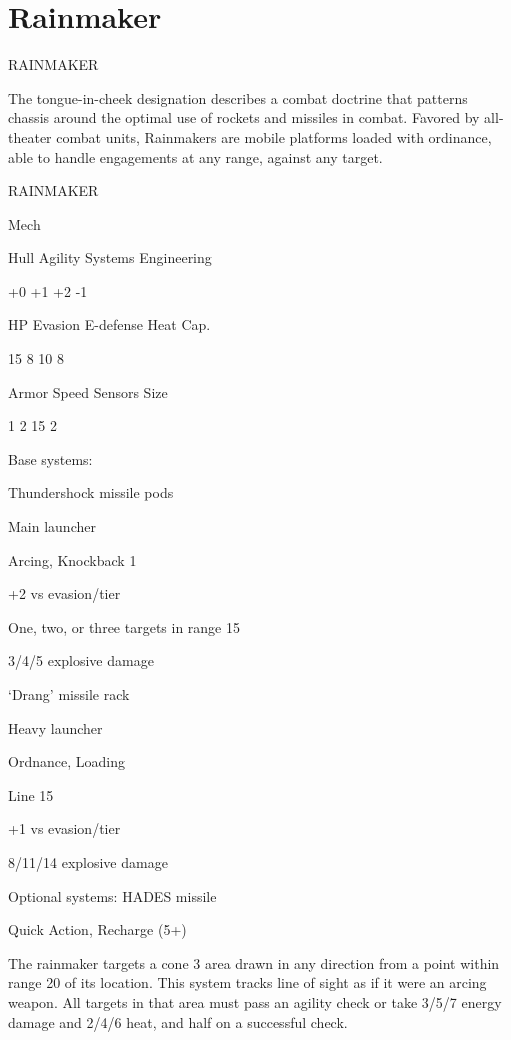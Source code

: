 \section{Rainmaker}

                                             RAINMAKER

The tongue-in-cheek designation describes a combat doctrine that patterns chassis around the
optimal use of rockets and missiles in combat. Favored by all-theater combat units, Rainmakers
are mobile platforms loaded with ordinance, able to handle engagements at any range, against
any target.


       RAINMAKER

       Mech

       Hull       Agility     Systems       Engineering

       +0         +1          +2            -1

       HP         Evasion     E-defense     Heat Cap.

       15         8           10            8

       Armor      Speed       Sensors       Size

       1          2           15            2

Base systems:

Thundershock missile pods

Main launcher

Arcing, Knockback 1

+2 vs evasion/tier

One, two, or three targets in range 15

3/4/5 explosive damage


‘Drang’ missile rack

Heavy launcher

Ordnance, Loading

Line 15

+1 vs evasion/tier

8/11/14 explosive damage


Optional systems:
HADES missile

Quick Action, Recharge (5+)

The rainmaker targets a cone 3 area drawn in any direction from a point within range 20 of its
location. This system tracks line of sight as if it were an arcing weapon. All targets in that area
must pass an agility check or take 3/5/7 energy damage and 2/4/6 heat, and half on a successful
check.





